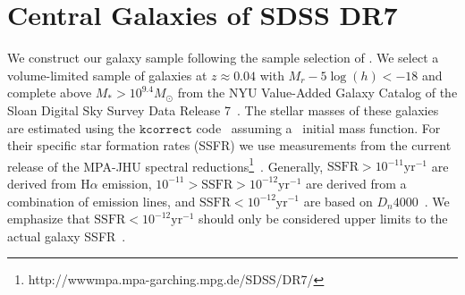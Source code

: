 \documentclass[12pt, letterpaper, preprint, tighten]{aastex62}
\begin{document}
\section{Central Galaxies of SDSS DR7} \label{sec:sdss}
We construct our galaxy sample following the sample selection of \cite{tinker2011}. 
We select a volume-limited sample of galaxies at $z \approx 0.04$ with 
$M_r - 5 \log(h) < -18$ and complete above $M_* > 10^{9.4} M_\odot$ from 
the NYU Value-Added Galaxy Catalog \citep[VAGC;][]{blanton2005} of the 
Sloan Digital Sky Survey Data Release 7~\citep[SDSS DR7;][]{abazajian2009}. 
The stellar masses of these galaxies are estimated using the
$\mathtt{kcorrect}$ code~\citep{blanton2007} assuming a~\cite{chabrier2003} 
initial mass function. For their specific star formation rates (SSFR) we use 
measurements from the current release of the MPA-JHU spectral 
reductions\footnote{http://wwwmpa.mpa-garching.mpg.de/SDSS/DR7/}~\citep{brinchmann2004}.
Generally, $\mathrm{SSFR} > 10^{-11}\mathrm{yr}^{-1}$ are derived from 
$\mathrm{H}\alpha$ emission, $10^{-11} > \mathrm{SSFR} > 10^{-12}\mathrm{yr}^{-1}$
are derived from a combination of emission lines, and $\mathrm{SSFR} < 10^{-12}\mathrm{yr}^{-1}$
are based on $D_n 4000$~\citep[see discussion in][]{wetzel2013}. We emphasize that 
$\mathrm{SSFR} < 10^{-12}\mathrm{yr}^{-1}$ should only be considered upper limits 
to the actual galaxy SSFR~\citep{salim2007}.
\end{document}
